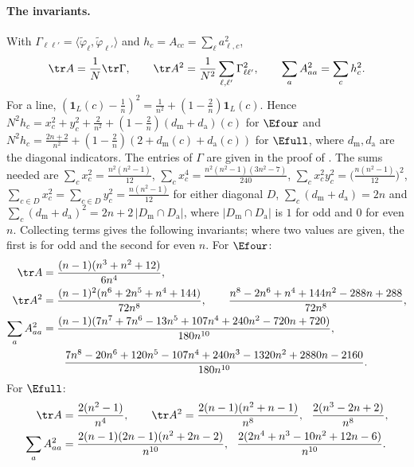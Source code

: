 \paragraph{The invariants.}
With $\Gamma_{\ell\ell'}=\langle\tilde\varphi_\ell,\tilde\varphi_{\ell'}\rangle$ and $h_c=A_{cc}=\sum_\ell a_{\ell,c}^2$,
\[
\tr A=\frac1N\tr\Gamma,\qquad\tr A^2=\frac1{N^2}\sum_{\ell,\ell'}\Gamma_{\ell\ell'}^2,\qquad\sum_aA_{aa}^2=\sum_ch_c^2 .
\]
For a line, $(\mathbf 1_L(c)-\frac1n)^2=\frac1{n^2}+(1-\frac2n)\mathbf 1_L(c)$.
Hence $N^2h_c=x_c^2+y_c^2+\frac2{n^2}+(1-\frac2n)(d_{\mathrm m}+d_{\mathrm a})(c)$ for $\Efour$ and $N^2h_c=\frac{2n+2}{n^2}+(1-\frac2n)(2+d_{\mathrm m}(c)+d_{\mathrm a}(c))$ for $\Efull$, where $d_{\mathrm m},d_{\mathrm a}$ are the diagonal indicators.
The entries of $\Gamma$ are given in the proof of .
The sums needed are $\sum_cx_c^2=\frac{n^2(n^2-1)}{12}$, $\sum_cx_c^4=\frac{n^2(n^2-1)(3n^2-7)}{240}$, $\sum_cx_c^2y_c^2=\bigl(\frac{n(n^2-1)}{12}\bigr)^2$, $\sum_{c\in D}x_c^2=\sum_{c\in D}y_c^2=\frac{n(n^2-1)}{12}$ for either diagonal $D$, $\sum_c(d_{\mathrm m}+d_{\mathrm a})=2n$ and $\sum_c(d_{\mathrm m}+d_{\mathrm a})^2=2n+2\,|D_{\mathrm m}\cap D_{\mathrm a}|$, where $|D_{\mathrm m}\cap D_{\mathrm a}|$ is $1$ for odd and $0$ for even $n$.
Collecting terms gives the following invariants; where two values are given, the first is for odd and the second for even $n$.
For $\Efour$:
\begin{equation}
\begin{aligned}
\tr A&=\frac{(n-1)(n^3+n^2+12)}{6n^4},\\
\tr A^2&=\frac{(n-1)^2(n^6+2n^5+n^4+144)}{72n^8},\qquad\frac{n^8-2n^6+n^4+144n^2-288n+288}{72n^8},\\
\sum_aA_{aa}^2&=\frac{(n-1)(7n^7+7n^6-13n^5+107n^4+240n^2-720n+720)}{180n^{10}},\\
&\qquad\frac{7n^8-20n^6+120n^5-107n^4+240n^3-1320n^2+2880n-2160}{180n^{10}}.
\end{aligned}
\label{eq:inv_low}
\end{equation}
For $\Efull$:
\begin{equation}
\begin{aligned}
\tr A&=\frac{2(n^2-1)}{n^4},\qquad
\tr A^2=\frac{2(n-1)(n^2+n-1)}{n^8},\ \ \frac{2(n^3-2n+2)}{n^8},\\
\sum_aA_{aa}^2&=\frac{2(n-1)(2n-1)(n^2+2n-2)}{n^{10}},\ \ \frac{2(2n^4+n^3-10n^2+12n-6)}{n^{10}}.
\end{aligned}
\label{eq:inv_full}
\end{equation}

